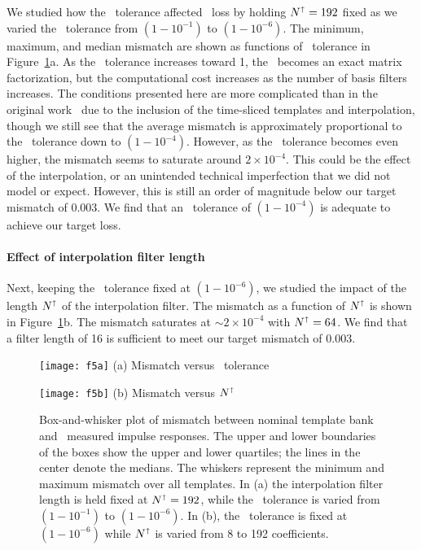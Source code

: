 We studied how the \SVD\ tolerance affected \SNR\ loss by holding
$N^\shortuparrow = 192$ fixed as we varied the \SVD\ tolerance from
$\left(1-10^{-1}\right)$ to $\left(1-10^{-6}\right)$.  The minimum, maximum, and median
mismatch are shown as functions of \SVD\ tolerance in
Figure~\ref{fig:bw}a.  As the \SVD\ tolerance increases toward 1, the
\SVD\ becomes an exact matrix factorization, but the computational cost increases as
the number of basis filters increases.  The conditions presented here are more
complicated than in the original work~\citep{Cannon:2010p10398} due to the inclusion
of the time-sliced templates and interpolation, though we still see that the average
mismatch is approximately proportional to the \SVD\ tolerance down to
$\left(1-10^{-4}\right)$.  However, as the \SVD\ tolerance becomes even higher, the
mismatch seems to saturate around $2 \times 10^{-4}$.  This could be the effect of the
interpolation, or an unintended technical imperfection that we did not model or expect.
However, this is still an order of magnitude below our target mismatch of 0.003.  We
find that an \SVD\ tolerance of $\left(1-10^{-4}\right)$ is adequate to achieve our
target \SNR{} loss.

\paragraph{Effect of interpolation filter length}

Next, keeping the \SVD\ tolerance fixed at $\left(1-10^{-6}\right)$, we studied the
impact of the length $N^\shortuparrow$ of the interpolation filter.  The mismatch as
a function of $N^\shortuparrow$ is shown in Figure~\ref{fig:bw}b.  The
mismatch saturates at $\sim$$2 \times 10^{-4}$ with $N^\shortuparrow = 64$.  We find
that a filter length of 16 is sufficient to meet our target mismatch of 0.003.

\begin{figure*}[b]
	\begin{minipage}[t]{0.5\textwidth}
		\begin{center}
			\texttt{[image: f5a]}
			(a) Mismatch versus \SVD\ tolerance
		\end{center}
	\end{minipage}
	\begin{minipage}[t]{0.5\textwidth}
		\begin{center}
			\texttt{[image: f5b]}
			(b) Mismatch versus $N^\shortuparrow$
		\end{center}
	\end{minipage}
	\caption{\label{fig:bw}Box-and-whisker plot of mismatch between nominal
template bank and \lloid\ measured impulse responses.  The upper and lower boundaries of
the boxes show the upper and lower quartiles; the lines in the center denote the medians.
The whiskers represent the minimum and maximum mismatch over all templates.  In 
(a) the interpolation filter length is held fixed at $N^\shortuparrow = 192$, while
the \SVD\ tolerance is varied from $\left(1-10^{-1}\right)$ to $\left(1-10^{-6}\right)$.
In (b), the \SVD\ tolerance is fixed at $\left(1-10^{-6}\right)$ while $N^\shortuparrow$
is varied from 8 to 192 coefficients.}
\end{figure*}


